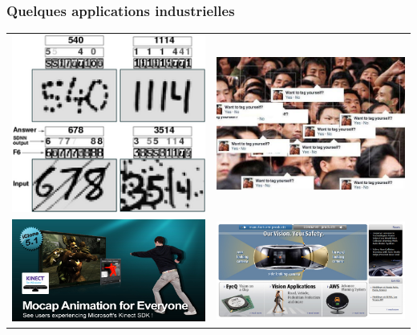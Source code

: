 \documentclass{beamer}
\begin{document}
\begin{frame}
\frametitle{Quelques applications industrielles}

\begin{tabular}{r l}
\includegraphics[width=0.4\linewidth]{img/sdnn-2.png} & \includegraphics[width=0.5\linewidth]{img/facereco.jpg} \\
 \includegraphics[width=0.4\linewidth]{img/kinect.jpg} &  \includegraphics[width=0.6\linewidth]{img/smart_cars.png}
\end{tabular}

\end{frame}
\end{document}
